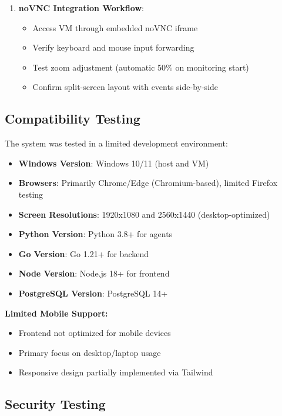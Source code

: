 \begin{itemize}
\begin{enumerate}
    \item \textbf{noVNC Integration Workflow}:
    \begin{itemize}
        \item Access VM through embedded noVNC iframe
        \item Verify keyboard and mouse input forwarding
        \item Test zoom adjustment (automatic 50\% on monitoring start)
        \item Confirm split-screen layout with events side-by-side
    \end{itemize}
\end{enumerate}

\subsection{Compatibility Testing}

The system was tested in a limited development environment:

\begin{itemize}
    \item \textbf{Windows Version}: Windows 10/11 (host and VM)
    \item \textbf{Browsers}: Primarily Chrome/Edge (Chromium-based), limited Firefox testing
    \item \textbf{Screen Resolutions}: 1920x1080 and 2560x1440 (desktop-optimized)
    \item \textbf{Python Version}: Python 3.8+ for agents
    \item \textbf{Go Version}: Go 1.21+ for backend
    \item \textbf{Node Version}: Node.js 18+ for frontend
    \item \textbf{PostgreSQL Version}: PostgreSQL 14+
\end{itemize}

\textbf{Limited Mobile Support:}
\begin{itemize}
    \item Frontend not optimized for mobile devices
    \item Primary focus on desktop/laptop usage
    \item Responsive design partially implemented via Tailwind
\end{itemize}

\subsection{Security Testing}


\end{itemize}
